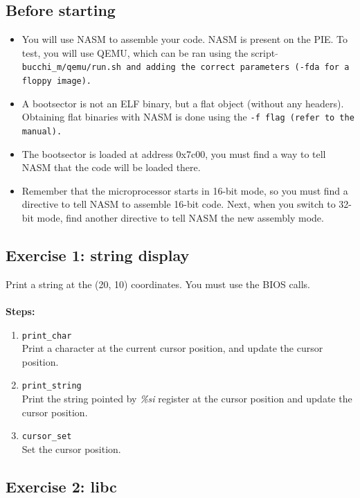 \subsection*{Before starting}

\begin{itemize}
\item
  You will use NASM to assemble your code. NASM is present on the
  PIE. To test, you will use QEMU, which can be ran using the script
  \tt $\tilde{}$bucchi\_m/qemu/run.sh \rm and adding the correct parameters
  (\tt -fda \rm for a floppy image).
\item
  A bootsector is not an ELF binary, but a flat object (without any
  headers). Obtaining flat binaries with NASM is done using the \tt -f \rm
  flag (refer to the manual).
\item
  The bootsector is loaded at address 0x7c00, you must find a way to
  tell NASM that the code will be loaded there.
\item
  Remember that the microprocessor starts in 16-bit mode, so you must
  find a directive to tell NASM to assemble 16-bit code. Next, when
  you switch to 32-bit mode, find another directive to tell NASM the
  new assembly mode.
\end{itemize}

\subsection*{Exercise 1: string display}
Print a string at the (20, 10) coordinates. You must use the BIOS calls.\\
\\
{\bf Steps:}
\begin{enumerate}
\item {\tt print\_char}\\
Print a character at the current cursor position, and update the cursor position.
\item {\tt print\_string}\\
Print the string pointed by {\em \%si} register at the cursor position and update the cursor position.
\item{\tt cursor\_set}\\
Set the cursor position.
\end{enumerate}




\subsection*{Exercise 2: libc}



